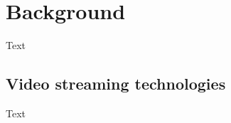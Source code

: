 \chapter{Background}
\label{cha:background}

Text


\section{Video streaming technologies}
\label{sec:background/technologies}

Text

